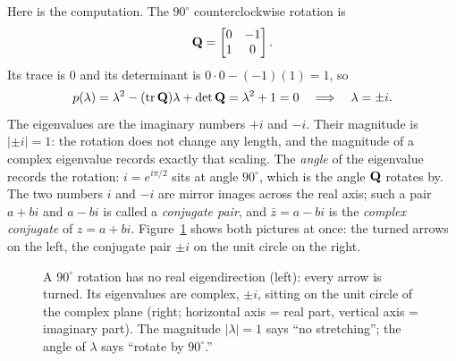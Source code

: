 Here is the computation. The $90^\circ$ counterclockwise rotation is
\[
  \mathbf{Q}=\begin{bmatrix}0 & -1\\ 1 & 0\end{bmatrix}.
\]
Its trace is $0$ and its determinant is $0\cdot 0-(-1)(1)=1$, so
\[
  p(\lambda)=\lambda^2-(\operatorname{tr}\mathbf{Q})\lambda+\det\mathbf{Q}=\lambda^2+1=0
  \quad\Longrightarrow\quad \lambda=\pm i.
\]
The eigenvalues are the imaginary numbers $+i$ and $-i$. Their magnitude is
$|{\pm i}|=1$: the rotation does not change any length, and the magnitude of a
complex eigenvalue records exactly that scaling. The \emph{angle} of the eigenvalue
records the rotation: $i=e^{i\pi/2}$ sits at angle $90^\circ$, which is the angle
$\mathbf{Q}$ rotates by. The two numbers $i$ and $-i$ are mirror images across the real
axis; such a pair $a+bi$ and $a-bi$ is called a \emph{conjugate pair}, and
$\bar z = a-bi$ is the \emph{complex conjugate} of $z=a+bi$.
Figure~\ref{ch23:fig-rotation} shows both pictures at once:
the turned arrows on the left, the conjugate pair $\pm i$ on the unit circle on the
right.

\begin{figure}[H]
\centering
{}
\caption{A $90^\circ$ rotation has no real eigendirection (left): every arrow is
turned. Its eigenvalues are complex, $\pm i$, sitting on the unit circle of the
complex plane (right; horizontal axis = real part, vertical axis = imaginary part).
The magnitude $|\lambda|=1$ says ``no stretching''; the
angle of $\lambda$ says ``rotate by $90^\circ$.''}
\label{ch23:fig-rotation}
\end{figure}


